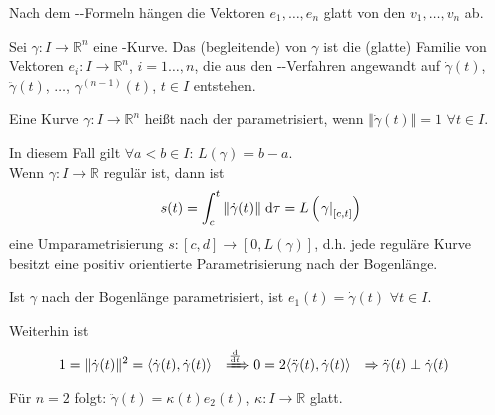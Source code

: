 \begin{underlinedenvironment}[Bemerkung]
	Nach dem --Formeln hängen die Vektoren $e_1,\dotsc,e_n$ glatt von den $v_1,\dotsc,v_n$ ab.
\end{underlinedenvironment}

\begin{definition}
	Sei $\gamma\!:I\to\mathbb{R}^n$ eine -Kurve. Das (begleitende)  von $\gamma$ ist die (glatte) Familie von Vektoren $e_i\!:I\to\mathbb{R}^n$, $i=1\dotsc,n$, die aus den --Verfahren angewandt auf $\dot{\gamma}(t)$, $\ddot{\gamma}(t)$, $\dotsc$, $\gamma^{(n-1)}(t)$, $t\in I$ entstehen.
\end{definition}

\begin{definition}
	Eine Kurve $\gamma\!:I\to\mathbb{R}^n$ heißt nach der  parametrisiert, wenn $\Vert \dot{\gamma}(t)\Vert = 1$ $\forall t\in I$.
\end{definition}

\begin{underlinedenvironment}[Bemerkung]
	In diesem Fall gilt $\forall a < b\in I$: $L(\gamma) = b - a$.\\
	Wenn $\gamma\!:I\to\mathbb{R}$ regulär ist, dann ist \begin{align*}
		s(t) = \int_c^t \Vert \dot{\gamma}(t)\Vert\;\mathrm{d}\tau = L\left( \left.\gamma_{\rule{0pt}{2mm}}\right|_{[c,t]}\right)
	\end{align*}
	eine Umparametrisierung $s\!:[c,d]\to [0,L(\gamma)]$, d.h. jede reguläre Kurve besitzt eine positiv orientierte Parametrisierung nach der Bogenlänge.
\end{underlinedenvironment}

\begin{underlinedenvironment}[Beobachtung]
	Ist $\gamma$ nach der Bogenlänge parametrisiert, ist $e_1(t) = \dot{\gamma}(t)$ $\forall t\in I$.
	
	Weiterhin ist \begin{align*}
		&1 = \Vert \dot{\gamma}(t)\Vert^2 = \langle \dot{\gamma}(t), \dot{\gamma}(t) \rangle &
		\xRightarrow[]{\frac{\mathrm{d}}{\mathrm{d}t}} \;& 0 = 2 \langle \ddot{\gamma}(t), \dot{\gamma}(t)\rangle &
		\Rightarrow\;& \ddot{\gamma}(t) \perp \dot{\gamma}(t)
	\end{align*}
	Für $n=2$ folgt: $\ddot{\gamma}(t) = \kappa (t) e_2(t)$, $\kappa\!:I\to\mathbb{R}$ glatt.
\end{underlinedenvironment}

